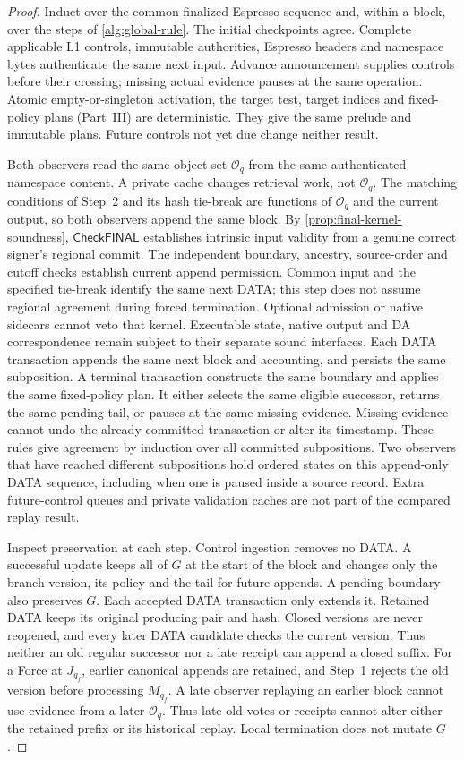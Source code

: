 \documentclass[11pt,a4paper]{article}
\newcommand{\tagg}[1]{\ensuremath{\mathsf{#1}}}
\begin{document}
\begin{proof}
Induct over the common finalized Espresso sequence and, within a block,
over the steps of \cref{alg:global-rule}.
The initial checkpoints agree. Complete applicable L1 controls,
immutable authorities, Espresso headers and namespace bytes authenticate
the same next input. Advance announcement supplies controls before their
crossing; missing actual evidence pauses at the same operation. Atomic
empty-or-singleton activation, the target test, target indices and
fixed-policy plans (Part~III) are deterministic. They give the same prelude
and immutable plans. Future controls not yet due change neither result.

Both observers read the same object set $\mathcal O_q$ from the same
authenticated namespace content. A private cache changes retrieval work,
not $\mathcal O_q$. The matching conditions of Step~2 and its hash tie-break are
functions of $\mathcal O_q$ and the current output, so both observers
append the same block. By \cref{prop:final-kernel-soundness},
\tagg{CheckFINAL} establishes intrinsic input validity from a genuine
correct signer's regional commit. The independent boundary, ancestry,
source-order and cutoff checks establish current append permission.
Common input and the specified tie-break identify the same next DATA;
this step does not assume regional agreement during forced termination.
Optional admission or
native sidecars cannot veto that kernel. Executable state, native output
and DA correspondence remain subject to their separate sound interfaces. Each DATA transaction appends the
same next block and accounting, and persists the same subposition.
A terminal transaction constructs the same boundary and applies the same
fixed-policy plan. It either selects the same eligible successor, returns
the same pending tail, or pauses at the same missing evidence. Missing evidence
cannot undo the already committed transaction or alter its timestamp.
These rules give agreement by induction over all committed subpositions.
Two observers that have reached different subpositions hold ordered
states on this append-only DATA sequence, including when one is paused
inside a source record. Extra future-control queues and private validation
caches are not part of the compared replay result.

Inspect preservation at each step. Control ingestion removes no DATA. A
successful update keeps all of $G$ at the start of the block and changes
only the branch version, its policy and the tail for future appends. A
pending boundary also preserves $G$. Each accepted DATA transaction only extends it. Retained DATA keeps its
original producing pair and hash. Closed versions are never reopened,
and every later DATA candidate checks the current version. Thus
neither an old regular successor nor a late receipt can append a closed
suffix. For a Force at $J_{q_f}$, earlier canonical appends are retained,
and Step~1 rejects the old version before processing $M_{q_f}$.
A late observer replaying an earlier block cannot use evidence from a
later $\mathcal O_q$. Thus late old votes or receipts cannot alter
either the retained prefix or its historical replay. Local termination
does not mutate $G$.
\end{proof}
\end{document}

